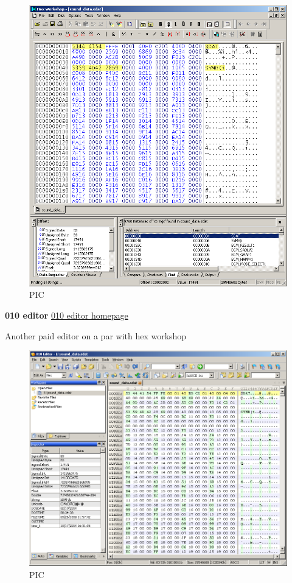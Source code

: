 \documentclass[
]{book}
\begin{document}
\begin{figure}
\centering
\includegraphics{images/1_home_fast6191_romhackingguide_unrenamed_files___mhackingguidehexeditorsshowcasehexworkshop1.png}
\caption{PIC}
\end{figure}

\textbf{010 editor} \href{http://www.sweetscape.com/010editor/}{010 editor homepage}

Another paid editor on a par with hex workshop

\begin{figure}
\centering
\includegraphics{images/2_home_fast6191_romhackingguide_unrenamed_files___romhackingguidehexeditorsshowcase010editor1.png}
\caption{PIC}
\end{figure}
\end{document}
